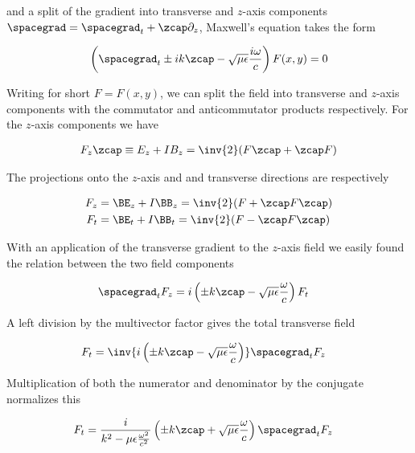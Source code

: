 and a split of the gradient into transverse and $z$-axis components $\spacegrad = \spacegrad_t + \zcap \partial_z$, Maxwell's equation takes the form

\begin{align}\label{eqn:transverseField:summaryMax2}
\left(\spacegrad_t \pm i k \zcap - \sqrt{\mu\epsilon}\frac{i\omega}{c}\right) F(x,y) = 0
\end{align}

Writing for short $F = F(x,y)$, we can split the field into transverse and $z$-axis components with the commutator and anticommutator products respectively.  For the $z$-axis components we have

\begin{align}\label{eqn:transverseField:foo4}
F_z \zcap \equiv E_z + I B_z = \inv{2} (F \zcap + \zcap F) 
\end{align}

The projections onto the $z$-axis and and transverse directions are respectively 

\begin{align}\label{eqn:transverseField:foo5}
F_z &= \BE_z + I \BB_z = \inv{2} (F + \zcap F \zcap) \\
F_t &= \BE_t + I \BB_t = \inv{2} (F - \zcap F \zcap)
\end{align}

With an application of the transverse gradient to the $z$-axis field we easily found the relation between the two field components

\begin{align}\label{eqn:transverseField:foo6}
\spacegrad_t F_z &= i \left( \pm k \zcap - \sqrt{\mu\epsilon}\frac{\omega}{c}\right) F_t
\end{align}

A left division by the multivector factor gives the total transverse field

\begin{align}\label{eqn:transverseField:foo7}
F_t &= \inv{i \left( \pm k \zcap - \sqrt{\mu\epsilon}\frac{\omega}{c}\right) } \spacegrad_t F_z 
\end{align}

Multiplication of both the numerator and denominator by the conjugate normalizes this

\begin{align}\label{eqn:transverseField:summaryTransverseBoth}
F_t &= \frac{i}{k^2 - \mu\epsilon\frac{\omega^2}{c^2}} \left( \pm k \zcap + \sqrt{\mu\epsilon}\frac{\omega}{c}\right) \spacegrad_t F_z
\end{align}

